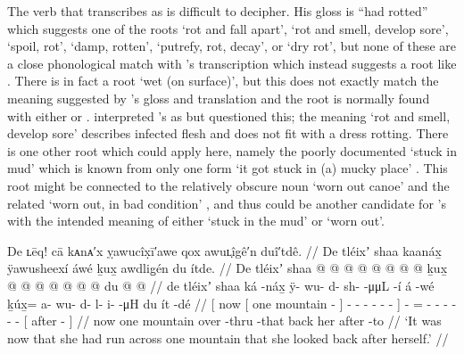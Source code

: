 The verb that \citeauthor{swanton:1909} transcribes as  is difficult to decipher.
His gloss is “had rotted” which suggests one of the roots  ‘rot and fall apart’,  ‘rot and smell, develop sore’,  ‘spoil, rot’,  ‘damp, rotten’,  ‘putrefy, rot, decay’, or  ‘dry rot’, but none of these are a close phonological match with \citeauthor{swanton:1909}’s transcription which instead suggests a root like .
There is in fact a root  ‘wet (on surface)’, but this does not exactly match the meaning suggested by \citeauthor{swanton:1909}’s gloss and translation and the root is normally found with either  or .
\textcite{leer:1977} interpreted \citeauthor{swanton:1909}’s  as  but questioned this; the meaning ‘rot and smell, develop sore’ describes infected flesh and does not fit with a dress rotting.
There is one other root which could apply here, namely the poorly documented  ‘stuck in mud’ which is known from only one form  ‘it got stuck in (a) mucky place’ \parencite[08/180]{leer:1973}.
This root might be connected to the relatively obscure noun  ‘worn out canoe’ and the related  ‘worn out, in bad condition’ \parencites[08/179]{leer:1973}[34]{leer:1978b}, and thus could be another candidate for \citeauthor{swanton:1909}’s  with the intended meaning of either ‘stuck in the mud’ or ‘worn out’.

\ex\label{ex:89-43-run-look-back}%
%
\begingl
	\glpreamble	De ʟēq! cā kᴀnᴀ′x ỵawucîx̣ī′awe qox awuʟ̣îgê′n duî′tdê. //
	\glpreamble	De tléixʼ shaa kaanáx̱ ÿawusheexí áwé ḵux̱ awdlig̱én du ítde. //
	\gla	{} De {} tléixʼ shaa  @ {} {}
			 @ {} @ {} @ {} @ {} @ {} @ {} {}
		 @ {}
		ḵux̱ @  @ {} @ {} @ {} @ {} @ {} @ {}
		{} du  @ {} @ {} {} //
	\glb	{} de {} tléixʼ shaa ká -náx̱ {} 
			ÿ- wu- d- sh-  -μμL -í {} 
		á -wé
		ḵúx̱= a- wu- d- l- i-  -μH
		{} du ít -dé {} //
	\glc	{}[ now {}[ one mountain  - {}]
			- - - -  - - {}]
		 -
		= - - - - -  -
		{}[  after - {}] //
	\gld	{} now {} one mountain over -thru {}
			 {} {} {} {} {} -that {}
		 {}
		back  {} {} {} {} {} {}
		{} her after -to {} //
	\glft	‘It was now that she had run across one mountain that she looked back after herself.’
		//
\endgl
\xe

